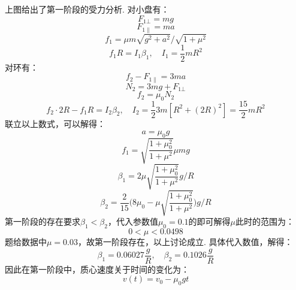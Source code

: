 \documentclass{ctexart}
\begin{document}
\noindent 上图给出了第一阶段的受力分析. 对小盘有：
\begin{equation}
    F_{1\bot}=mg \tag{3.1}
\end{equation}
\begin{equation}
    F_{1\parallel}=ma \tag{3.2}
\end{equation}
\begin{equation}
    f_1=\mu m\sqrt{g^2+a^2}\Big/\sqrt{1+\mu^2} \tag{3.3}
\end{equation}
\begin{equation}
    f_1R=I_1\beta_1 ,\quad I_1=\frac{1}{2}mR^2 \tag{3.4}
\end{equation}
对环有：
\begin{equation}
    f_2-F_{1\parallel}=3ma \tag{3.5}
\end{equation}
\begin{equation}
    N_2=3mg+F_{1\bot} \tag{3.6}
\end{equation}
\begin{equation}
    f_2=\mu_0 N_2 \tag{3.7}
\end{equation}
\begin{equation}
    f_2\cdot 2R-f_1R=I_2\beta_2 ,\quad I_2=\frac{1}{2}3m[R^2+(2R)^2]=\frac{15}{2}mR^2 \tag{3.8}
\end{equation}
联立以上数式，可以解得：
\begin{equation}
    a=\mu_0 g \tag{3.9}
\end{equation}
\begin{equation}
    f_1=\sqrt{\frac{1+\mu_0^2}{1+\mu^2}}\mu mg \tag{3.10}
\end{equation}
\begin{equation}
\beta_1=2\mu\sqrt{\frac{1+\mu_0^2}{1+\mu^2}}g/R \tag{3.11}
\end{equation}
\begin{equation}
\beta_2=\frac{2}{15}\Big(8\mu_0-\mu \sqrt{\frac{1+\mu_0^2}{1+\mu^2}}\Big)g/R \tag{3.12}
\end{equation}
第一阶段的存在要求$\beta_1<\beta_2$，代入参数值$\mu_0=0.1$的即可解得$\mu$此时的范围为：
\begin{equation}
    0<\mu<0.0498 \tag{3.13}
\end{equation}
题给数据中$\mu=0.03$，故第一阶段存在，以上讨论成立. 具体代入数值，解得：
\begin{equation}
    \beta_1=0.06027\frac{g}{R},\quad \beta_2=0.1026\frac{g}{R} \tag{3.14}
\end{equation}
因此在第一阶段中，质心速度关于时间的变化为：
\begin{equation}
    v(t)=v_0-\mu_0 g t \tag{3.15}
\end{equation}
\end{document}
